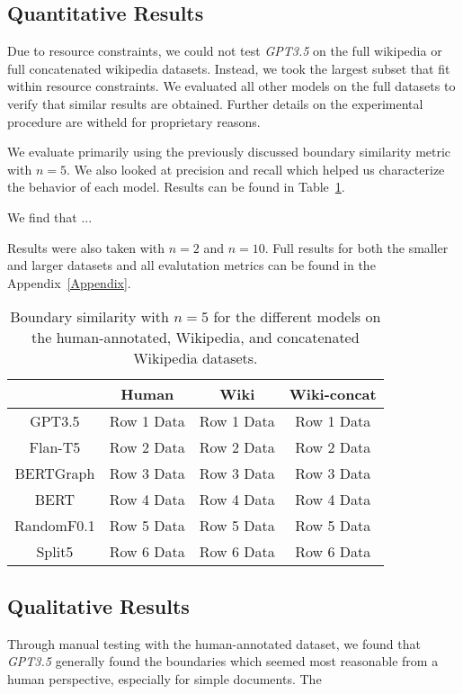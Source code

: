 
\subsection{Quantitative Results}

Due to resource constraints, we could not test \emph{GPT3.5} on the full wikipedia or full concatenated wikipedia datasets. Instead, we took the largest subset that fit within resource constraints. We evaluated all other models on the full datasets to verify that similar results are obtained. Further details on the experimental procedure are witheld for proprietary reasons.

We evaluate primarily using the previously discussed boundary similarity metric with $n=5$. We also looked at precision and recall which helped us characterize the behavior of each model. Results can be found in Table~\ref{tab:quant_results}. 

We find that ...

Results were also taken with $n=2$ and $n=10$. Full results for both the smaller and larger datasets and all evalutation metrics can be found in the Appendix~\ref{Appendix}.

\begin{table}[ht]
\centering
\begin{tabular}{c|ccc}
& Human & Wiki & Wiki-concat \\ \hline
GPT3.5  & Row 1 Data & Row 1 Data & Row 1 Data \\ 
Flan-T5  & Row 2 Data & Row 2 Data & Row 2 Data \\ 
BERTGraph & Row 3 Data & Row 3 Data & Row 3 Data \\ 
BERT & Row 4 Data & Row 4 Data & Row 4 Data \\
RandomF0.1& Row 5 Data & Row 5 Data & Row 5 Data \\
Split5 & Row 6 Data & Row 6 Data & Row 6 Data \\
\end{tabular}
\caption{Boundary similarity with $n=5$ for the different models on the human-annotated, Wikipedia, and concatenated Wikipedia datasets.}
\label{tab:quant_results}
\end{table}

\subsection{Qualitative Results}

Through manual testing with the human-annotated dataset, we found that \emph{GPT3.5} generally found the boundaries which seemed most reasonable from a human perspective, especially for simple documents. The 


